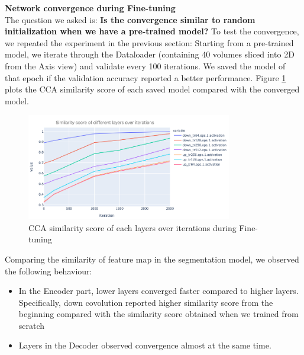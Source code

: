 
\textbf{Network convergence during Fine-tuning}\\

The question we asked is: \textbf{Is the convergence similar to random initialization when we have a pre-trained model?}
To test the convergence, we repeated the experiment in the previous section: Starting from a pre-trained model, we iterate through the Dataloader (containing 40 volumes sliced into 2D from the Axis view) and validate every 100 iterations. We saved the model of that epoch if the validation accuracy reported a better performance. Figure \ref{fig:transfer-convergence} plots the CCA similarity score of each saved model compared with the converged model.

\begin{figure}
	\centering
	\includegraphics[width=0.8\textwidth]{img/SVCCA/CCA_score_transfer_learning}
	\caption{CCA similarity score of each layers over iterations during Fine-tuning}
	\label{fig:transfer-convergence}
\end{figure}

Comparing the similarity of feature map in the segmentation model, we observed the following behaviour:
\begin{itemize}
	\item In the Encoder part, lower layers converged faster compared to higher layers. Specifically, down covolution reported higher similarity score from the beginning compared with the similarity score obtained when we trained from scratch
	\item Layers in the Decoder observed convergence almost at the same time.
\end{itemize}

